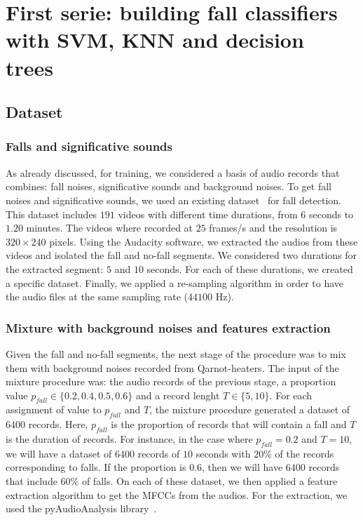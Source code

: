 \documentclass[10pt, conference, compsocconf]{IEEEtran}
\begin{document}
\section{First serie: building fall classifiers with SVM, KNN and decision trees} \label{Fall}

\subsection{Dataset}

\subsubsection{Falls and significative sounds} 

As already discussed, for training, we considered a basis of audio records that combines: fall noises, significative sounds and 
background noises. To get fall noises and significative sounds, we used an existing dataset~\cite{Dataset} for fall detection. 
This dataset includes $191$ videos with different time durations, from $6$ seconds to $1.20$ minutes. The videos where recorded 
at $25$ frames/s and the resolution is $320 \times 240$ pixels.  Using the Audacity software, we extracted the audios from these videos 
and isolated the fall and no-fall segments. We considered two durations for the extracted segment: $5$ and $10$ seconds. For each of 
these durations, we created a specific dataset. Finally, we applied a re-sampling algorithm in order to have the audio files at 
the same sampling rate ($44100$ Hz).

\subsubsection{Mixture with background noises and features extraction}

Given the fall and no-fall segments, the next stage of the procedure was to mix them with background noises recorded from 
Qarnot-heaters. The input of the mixture procedure was: the audio records of the previous stage, a proportion 
value $p_{fall} \in \{ 0.2, 0.4, 0.5, 0.6 \}$ and a record lenght $T \in \{ 5, 10 \}$. For each assignment of value to $p_{fall}$ and $T$, the mixture procedure generated a dataset of $6400$ records. Here, $p_{fall}$ is the proportion of records that will contain a fall 
and $T$ is the duration of records. For instance, in the case where $p_{fall} = 0.2$ and $T = 10$, we will have a dataset 
of $6400$ records of $10$ seconds with $20$\% of the records corresponding to falls. If the proportion is $0.6$, then we will 
have  $6400$ records that include $60$\% of falls.  On each of these dataset, we then applied a feature extraction algorithm 
to get the MFCCs from the audios. For the extraction, we used the pyAudioAnalysis library~\cite{giannakopoulos2015pyaudioanalysis}. 
\end{document}
